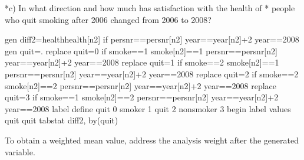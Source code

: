 \documentclass[letterpaper,10pt,openany,onesideH,english]{sphinxmanual}
\begin{document}
%
\begin{sphinxVerbatim}[commandchars=\\\{\},numbers=left,firstnumber=1,stepnumber=1]
*c) In what direction and how much has satisfaction with the health of 
*   people who quit smoking after 2006 changed from 2006 to 2008?

	gen diff2=health\PYGZhy{}health[\PYGZus{}n\PYGZhy{}2] if persnr==persnr[\PYGZus{}n\PYGZhy{}2] \PYGZam{} year==year[\PYGZus{}n\PYGZhy{}2]+2 \PYGZam{} year==2008
	gen quit=.
	replace quit=0 if smoke==1 \PYGZam{} smoke[\PYGZus{}n\PYGZhy{}2]==1 \PYGZam{} persnr==persnr[\PYGZus{}n\PYGZhy{}2] \PYGZam{} year==year[\PYGZus{}n\PYGZhy{}2]+2 \PYGZam{} year==2008
	replace quit=1 if smoke==2 \PYGZam{} smoke[\PYGZus{}n\PYGZhy{}2]==1 \PYGZam{} persnr==persnr[\PYGZus{}n\PYGZhy{}2] \PYGZam{} year==year[\PYGZus{}n\PYGZhy{}2]+2 \PYGZam{} year==2008
	replace quit=2 if smoke==2 \PYGZam{} smoke[\PYGZus{}n\PYGZhy{}2]==2 \PYGZam{} persnr==persnr[\PYGZus{}n\PYGZhy{}2] \PYGZam{} year==year[\PYGZus{}n\PYGZhy{}2]+2 \PYGZam{} year==2008
	replace quit=3 if smoke==1 \PYGZam{} smoke[\PYGZus{}n\PYGZhy{}2]==2 \PYGZam{} persnr==persnr[\PYGZus{}n\PYGZhy{}2] \PYGZam{} year==year[\PYGZus{}n\PYGZhy{}2]+2 \PYGZam{} year==2008
	label define quit 0 \PYGZdq{}smoker\PYGZdq{} 1 \PYGZdq{}quit\PYGZdq{} 2 \PYGZdq{}non\PYGZhy{}smoker\PYGZdq{} 3 \PYGZdq{}begin\PYGZdq{}
	label values quit quit
	tabstat diff2, by(quit)
\end{sphinxVerbatim}

\begin{figure}[H]
\centering

\noindent{}
\end{figure}

To obtain a weighted mean value, address the analysis weight after the generated variable.

%
\begin{sphinxVerbatim}[commandchars=\\\{\},numbers=left,firstnumber=1,stepnumber=1]
	  \PYG{p}{[}\PYG{p}{]} 	
\end{sphinxVerbatim}

\begin{figure}[H]
\centering

\noindent{}
\end{figure}
\end{document}
